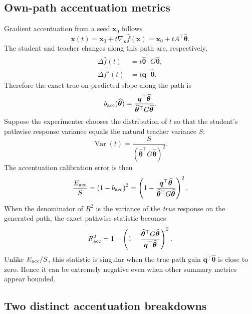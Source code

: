 \documentclass[11pt]{article}
\newcommand{\Var}{\operatorname{Var}}
\newcommand{\that}{\widehat{\bm\theta}}
\begin{document}
\subsection{Own-path accentuation metrics}

Gradient accentuation from a seed $\bm x_0$ follows
\begin{equation}
  \bm x(t)=\bm x_0+t\nabla_{\bm x}\widehat f(\bm x)
           =\bm x_0+tA^{\top}\that.
  \label{eq:feature-accent-path}
\end{equation}
The student and teacher changes along this path are, respectively,
\begin{align}
  \Delta\widehat f(t)&=t\that^{\top}G\that,\\
  \Delta f^{\star}(t)&=t\bm q^{\top}\that.
  \label{eq:path-gains}
\end{align}
Therefore the exact true-on-predicted slope along the path is
\begin{equation}
  b_{\rm acc}(\that)
  =\frac{\bm q^{\top}\that}{\that^{\top}G\that}.
  \label{eq:slope-acc-exact}
\end{equation}
Suppose the experimenter chooses the distribution of $t$ so that the
student's pathwise response variance equals the natural teacher variance $S$:
\begin{equation}
  \Var(t)=\frac{S}{(\that^{\top}G\that)^2}.
\end{equation}
The accentuation calibration error is then
\begin{equation}
  \frac{E_{\rm acc}}{S}
  =\left(1-b_{\rm acc}\right)^2
  =\left(1-\frac{\bm q^{\top}\that}
                   {\that^{\top}G\that}\right)^2.
  \label{eq:acc-error-exact}
\end{equation}
When the denominator of $R^2$ is the variance of the \emph{true} response on
the generated path, the exact pathwise statistic becomes
\begin{equation}
  R^2_{\rm acc}
  =1-\left(1-\frac{\that^{\top}G\that}
                        {\bm q^{\top}\that}\right)^2.
  \label{eq:r2-acc-exact}
\end{equation}
Unlike $E_{\rm acc}/S$, this statistic is singular when the true path gain
$\bm q^{\top}\that$ is close to zero.  Hence it can be extremely negative even
when other summary metrics appear bounded.

\subsection{Two distinct accentuation breakdowns}
\end{document}
